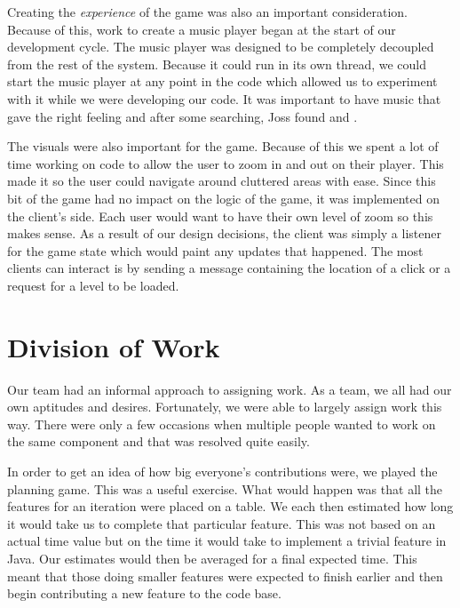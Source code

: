 Creating the \emph{experience} of the game was also an important
consideration. Because of this, work to create a music player began at
the start of our development cycle. The music player was designed to
be completely decoupled from the rest of the system. Because it could
run in its own thread, we could start the music player at any point in
the code which allowed us to experiment with it while we were
developing our code. It was important to have music that gave the
right feeling and after some searching, Joss found \cite{dj_sasha} and
\cite{macleod}.

The visuals were also important for the game. Because of this we spent
a lot of time working on code to allow the user to zoom in and out on
their player. This made it so the user could navigate around cluttered
areas with ease. Since this bit of the game had no impact on the logic
of the game, it was implemented on the client's side. Each user would
want to have their own level of zoom so this makes sense. As a result
of our design decisions, the client was simply a listener for the game
state which would paint any updates that happened. The most clients
can interact is by sending a message containing the location of a
click or a request for a level to be loaded.


\section{Division of Work}

Our team had an informal approach to assigning work. As a team, we all
had our own aptitudes and desires. Fortunately, we were able to
largely assign work this way. There were only a few occasions when
multiple people wanted to work on the same component and that was
resolved quite easily.

In order to get an idea of how big everyone's contributions were, we
played the planning game. This was a useful exercise. What would
happen was that all the features for an iteration were placed on a
table. We each then estimated how long it would take us to complete
that particular feature. This was not based on an actual time value
but on the time it would take to implement a trivial feature in
Java. Our estimates would then be averaged for a final expected
time. This meant that those doing smaller features were expected to
finish earlier and then begin contributing a new feature to the code
base.



